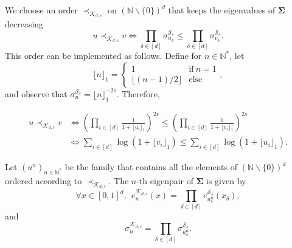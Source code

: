 \documentclass[twoside,11pt]{book}
\numberwithin{theorem}{chapter}
\numberwithin{definition}{chapter}
\numberwithin{proposition}{chapter}
\numberwithin{corollary}{chapter}
\numberwithin{example}{chapter}
\numberwithin{lemma}{chapter}
\numberwithin{assumption}{chapter}
\numberwithin{equation}{chapter}
\numberwithin{figure}{chapter}
\begin{document}
We choose an order $\prec_{\mathcal{K}_{d,s}}$ on $(\mathbb{N}\smallsetminus \{0\})^{d}$ that keeps the eigenvalues of $\bm{\Sigma}$ decreasing
\begin{equation}
u \prec_{\mathcal{K}_{d,s}} v \iff  \prod\limits_{\delta \in [d]} \sigma^{\mathcal{S}_{s}}_{u_{\delta}} \leq \prod\limits_{\delta \in [d]} \sigma^{\mathcal{S}_{s}}_{v_{\delta}}.
\end{equation}
This order can be implemented as follows. Define for $n \in \mathbb{N}^{*}$, let
\begin{equation}
 \lfloor{n\rfloor}_{1} = \left\{
    \begin{array}{ll}
        1 & \mbox{if} \:n =1 \\
        \lfloor{(n-1)/2\rfloor} & \mbox{else}
    \end{array}
\right. ,
\end{equation}
and observe that $\sigma_{n}^{\mathcal{S}_{s}} = \lfloor{n\rfloor}_{1}^{-2s}$. Therefore,




\begin{align}
u \prec_{\mathcal{K}_{d,s}} v  & \iff \left(\prod\limits_{i \in [d]} \frac{1}{1+\lfloor{u_{i} \rfloor}_{1}} \right)^{2s} \leq \left(\prod\limits_{i \in [d]} \frac{1}{1+\lfloor{v_{i}\rfloor}_{1}} \right)^{2s} \\
& \iff \sum\limits_{i \in [d]} \log(1+\lfloor{v_{i} \rfloor}_{1})  \leq \sum\limits_{i \in [d]} \log(1+\lfloor{u_{i} \rfloor}_{1}) .
\label{e:orderSobolev}
\end{align}

Let $(u^{n})_{n \in \mathbb{N}^{*}}$ be the family that contains all the elements of $(\mathbb{N} \smallsetminus \{0\})^d$  ordered according to $\prec_{\mathcal{K}_{d,s}}$. The $n$-th eigenpair of $\bm{\Sigma}$ is given by
\begin{equation}
\forall x \in [0,1]^{d}, \:\:e_{n}^{\mathcal{K}_{d,s}}(x) = \prod\limits_{\delta \in [d]} e_{u_{\delta}^{n}}^{\mathcal{S}_{s}}(x_{\delta}),
\end{equation}
and
\begin{equation}
\sigma_{n}^{\mathcal{K}_{d,s}} = \prod\limits_{\delta \in [d]} \sigma_{u_{\delta}^{n}}^{\mathcal{S}_{s}}.
\end{equation}
\end{document}
